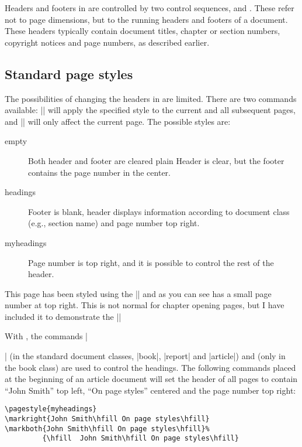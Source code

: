 Headers and footers in \latex are controlled by two control sequences,  and . These refer not to page dimensions, but to the running headers and footers of a document. These headers typically contain document titles, chapter or section numbers, copyright notices and page numbers, as described earlier.


\subsection{Standard page styles}

The possibilities of changing the headers in \latexe are  limited. There are two commands available: |\pagestyle{style}| will apply the specified style to the current and all subsequent pages, and |\thispagestyle{style}| will only affect the current page. The possible styles are:

\begin{description}
\item[empty]	Both header and footer are cleared
plain	Header is clear, but the footer contains the page number in the center.
\item[headings]	Footer is blank, header displays information according to document class (e.g., section name) and page number top right.
\item[myheadings]	Page number is top right, and it is possible to control the rest of the header.
\end{description}

This page has been styled using the |\thispagestyle| and as you can see has a small page number at top right. This is not normal for chapter opening pages, but I have included it to demonstrate the |\thispagestyle{}|


With , the commands |\markright| (in the standard document classes, |book|, |report| and |article|) and  (only in the book class) are used to control the headings. The following commands placed at the beginning of an article document will set the header of all pages to contain ``John Smith'' top left, ``On page styles'' centered and the page number top right:


\begin{verbatim}
\pagestyle{myheadings}
\markright{John Smith\hfill On page styles\hfill}
\markboth{John Smith\hfill On page styles\hfill}%
         {\hfill  John Smith\hfill On page styles\hfill}
\end{verbatim}

